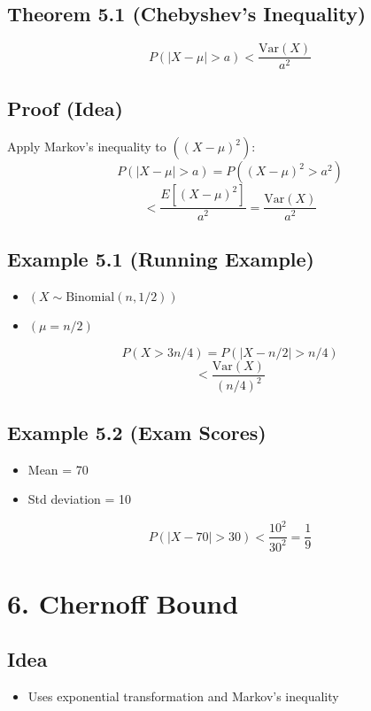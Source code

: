 \documentclass[11pt]{article}
\begin{document}
\subsection*{Theorem 5.1 (Chebyshev’s Inequality)}

\[
P(|X - \mu| > a) < \frac{\text{Var}(X)}{a^2}
\]

\subsection*{Proof (Idea)}

Apply Markov’s inequality to $( (X - \mu)^2 )$:
\[
P(|X - \mu| > a) = P((X-\mu)^2 > a^2)
\]
\[
< \frac{E[(X-\mu)^2]}{a^2} = \frac{\text{Var}(X)}{a^2}
\]

\subsection*{Example 5.1 (Running Example)}

\begin{itemize}
\item $( X \sim \text{Binomial}(n,1/2) )$
\item $( \mu = n/2 )$
\end{itemize}

\[
P(X > 3n/4) = P(|X - n/2| > n/4)
\]
\[
< \frac{\text{Var}(X)}{(n/4)^2}
\]

\subsection*{Example 5.2 (Exam Scores)}

\begin{itemize}
\item Mean = 70
\item Std deviation = 10
\end{itemize}

\[
P(|X - 70| > 30) < \frac{10^2}{30^2} = \frac{1}{9}
\]

\section*{6. Chernoff Bound}

\subsection*{Idea}

\begin{itemize}
\item Uses exponential transformation and Markov’s inequality
\end{itemize}
\end{document}
